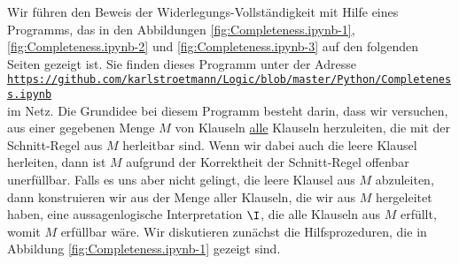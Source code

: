 Wir führen den Beweis der Widerlegungs-Vollständigkeit mit Hilfe eines Programms, das in den
Abbildungen \ref{fig:Completeness.ipynb-1}, \ref{fig:Completeness.ipynb-2} und
\ref{fig:Completeness.ipynb-3} auf den folgenden Seiten gezeigt ist.  Sie finden dieses Programm unter der Adresse
\\[0.2cm]
\hspace*{0.8cm}
\href{https://github.com/karlstroetmann/Logic/blob/master/Python/Completeness.ipynb}{\texttt{https://github.com/karlstroetmann/Logic/blob/master/Python/Completeness.ipynb}}
\\[0.2cm]
im Netz.  Die Grundidee
bei diesem Programm besteht darin, dass wir versuchen, aus einer gegebenen Menge $M$ von Klauseln
\underline{alle} Klauseln herzuleiten, die mit der Schnitt-Regel aus $M$ herleitbar sind.  Wenn wir dabei auch
die leere Klausel herleiten, dann ist $M$ aufgrund der Korrektheit der Schnitt-Regel offenbar
unerfüllbar.  Falls es uns aber nicht gelingt, die leere Klausel aus $M$ abzuleiten, dann konstruieren wir
aus der Menge aller Klauseln, die wir aus $M$ hergeleitet haben, eine aussagenlogische Interpretation
$\I$, die alle Klauseln aus $M$ erfüllt, womit $M$ erfüllbar wäre.
Wir diskutieren zunächst die Hilfsprozeduren, die in Abbildung \ref{fig:Completeness.ipynb-1} gezeigt
sind. 
